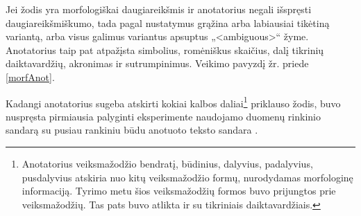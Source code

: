 \documentclass{VUMIFInfBakalaurinis}
\begin{document}
Jei žodis yra morfologiškai daugiareikšmis ir anotatorius negali
išspręsti daugiareikšmiškumo, tada pagal nustatymus grąžina arba
labiausiai tikėtiną variantą, arba visus galimus variantus apsuptus
„\textless ambiguous\textgreater“ žyme. Anotatorius taip pat atpažįsta
simbolius, romėniškus skaičius, dalį tikrinių daiktavardžių, akronimas
ir sutrumpinimus. Veikimo pavyzdį žr. priede \ref{morfAnot}.

Kadangi anotatorius sugeba atskirti kokiai kalbos daliai\footnote{Anotatorius
  veiksmažodžio bendratį, būdinius, dalyvius, padalyvius, pusdalyvius
  atskiria nuo kitų veiksmažodžio formų, nurodydamas morfologinę
  informaciją. Tyrimo metu šios veiksmažodžių formos buvo prijungtos
  prie veiksmažodžių. Tas pats buvo atlikta ir su tikriniais
  daiktavardžiais.} priklauso žodis, buvo nuspręsta pirmiausia palyginti
eksperimente naudojamo duomenų rinkinio sandarą su pusiau rankiniu būdu
anotuoto teksto sandara \cite{utka2009davzninis}.
\end{document}
